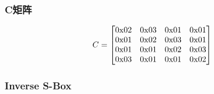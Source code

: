 \subsubsection*{C矩阵}

\begin{equation}
    C=
    \left[\begin{matrix}
        {\rm 0x}02 & {\rm 0x}03 & {\rm 0x}01 & {\rm 0x}01 \\
        {\rm 0x}01 & {\rm 0x}02 & {\rm 0x}03 & {\rm 0x}01 \\
        {\rm 0x}01 & {\rm 0x}01 & {\rm 0x}02 & {\rm 0x}03 \\
        {\rm 0x}03 & {\rm 0x}01 & {\rm 0x}01 & {\rm 0x}02 \\
    \end{matrix}\right]
    \label{C}
\end{equation}

\subsubsection*{Inverse S-Box}

